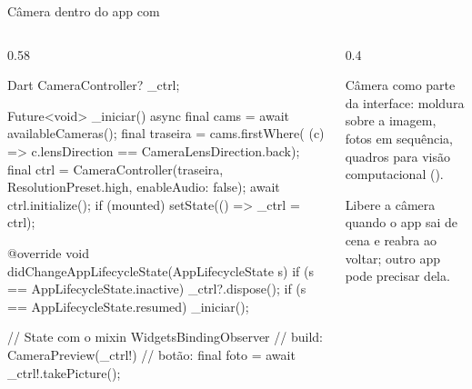 \documentclass[aspectratio=169,10pt]{beamer}
\begin{document}
\begin{frame}[fragile]{Câmera dentro do app com }
  \begin{columns}[T]
    \begin{column}{0.58\textwidth}
\begin{codigo}[title=Tela de captura (trechos do State)]{Dart}
CameraController? _ctrl;

Future<void> _iniciar() async {
  final cams = await availableCameras();
  final traseira = cams.firstWhere(
      (c) => c.lensDirection == CameraLensDirection.back);
  final ctrl = CameraController(traseira,
      ResolutionPreset.high, enableAudio: false);
  await ctrl.initialize();
  if (mounted) setState(() => _ctrl = ctrl);
}

@override
void didChangeAppLifecycleState(AppLifecycleState s) {
  if (s == AppLifecycleState.inactive) _ctrl?.dispose();
  if (s == AppLifecycleState.resumed) _iniciar();
}

// State com o mixin WidgetsBindingObserver
// build: CameraPreview(_ctrl!)
// botão: final foto = await _ctrl!.takePicture();
\end{codigo}
    \end{column}
    \begin{column}{0.4\textwidth}
      \begin{conceito}
        Câmera como parte da interface: moldura sobre a imagem, fotos em sequência, quadros para visão computacional ().
      \end{conceito}
      \begin{atencao}
        Libere a câmera quando o app sai de cena e reabra ao voltar; outro app pode precisar dela.
      \end{atencao}
    \end{column}
  \end{columns}
\end{frame}
\end{document}
